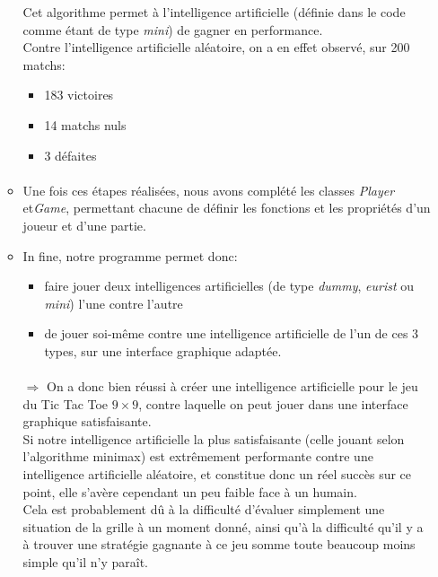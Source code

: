 \documentclass[10pt]{article}
\begin{document}
\begin{enumerate}
\begin{itemize}
Cet algorithme permet à l'intelligence artificielle (définie dans le code comme étant de type \textit{mini}) de gagner en performance. \\
Contre l'intelligence artificielle aléatoire, on a en effet observé, sur 200 matchs: 
\begin{itemize}
    \item 183 victoires
    \item 14 matchs nuls
    \item 3 défaites 
\end{itemize}

\paragraph{}
\item Une fois ces étapes réalisées, nous avons complété les classes \textit{Player} et\textit{Game}, permettant chacune de définir les fonctions et les propriétés d'un joueur et d'une partie. 

\item In fine, notre programme permet donc: 
\begin{itemize}
    \item faire jouer deux intelligences artificielles (de type \textit{dummy}, \textit{eurist} ou \textit{mini}) l'une contre l'autre
    \item de jouer soi-même contre une intelligence artificielle de l'un de ces 3 types, sur une interface graphique adaptée.

\end{itemize}
\paragraph{}
$\Longrightarrow$ On a donc bien réussi à créer une intelligence artificielle pour le jeu du Tic Tac Toe $9\times9$, contre laquelle on peut jouer dans une interface graphique satisfaisante. \\
Si notre intelligence artificielle la plus satisfaisante (celle jouant selon l'algorithme minimax) est extrêmement performante contre une intelligence artificielle aléatoire, et constitue donc un réel succès sur ce point, elle s'avère cependant un peu faible face à un humain. \\
Cela est probablement dû à la difficulté d'évaluer simplement une situation de la grille à un moment donné, ainsi qu'à la difficulté qu'il y a à trouver une stratégie gagnante à ce jeu somme toute beaucoup moins simple qu'il n'y paraît. 



\end{itemize}
\end{enumerate}
\end{document}
